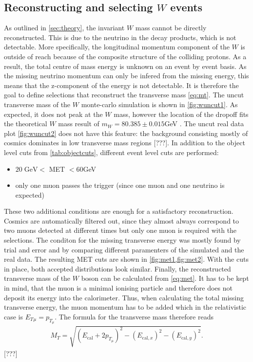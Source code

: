 \documentclass[twoside,        %
               BCOR12mm,       %
               ngerman,english, %
               fleqn,headsepline=false,footsepline=false
              ]{Vorlage/MFPREPORT}
\begin{document}
\subsection{Reconstructing and selecting $W$ events}
As outlined in \cref{sec:theory}, the invariant $W$ mass cannot be directly
reconstructed. This is due to the neutrino in the decay products, which is not
detectable. More specifically, the longitudinal momentum component of the $W$ is
outside of reach because of the composite structure of the colliding protons.
As a result, the total centre of mass energy is unknown on an event by event
basis. As the missing neutrino momentum can only be infered from the missing energy,
this means that the z-component of the energy is not detectable.
It is therefore the goal to define selections that reconstruct the transverse
mass \cref{eq:mt}. The uncut transverse mass of the $W$ monte-carlo simulation
is shown in \cref{fig:wuncut1}. As expected, it does not peak at the $W$ mass,
however the location of the dropoff fits the theoretical $W$ mass result of
$m_W=80.385\pm0.015$\;GeV \cite{pdataz}. The uncut real data plot
\cref{fig:wuncut2} does not have this feature: the background consisting mostly
of cosmics dominates in low transverse mass regions [???]. In addition to the
object level cuts from \cref{tab:objectcuts}, different event level cuts are
performed:
\begin{itemize}
    \item $20\;\text{GeV}<$ MET $<60$\;GeV
    \item only one muon passes the trigger (since one muon and one neutrino is
        expected)
\end{itemize}
These two additional conditions are enough for a satisfactory reconstruction.
Cosmics are automatically filtered out, since they almost always correspond to
two muons detected at different times but only one muon is required with the
selections. The conditon for the missing transverse energy was mostly found by
trial and error and by comparing different paramenters of the simulated and the
real data. The resulting MET cuts are shown in \cref{fig:met1,fig:met2}. With
the cuts in place, both accepted distributions look similar.
Finally, the reconstructed transverse mass of the $W$ boson can be calculated
from \cref{eq:met}. It has to be kept in mind, that the muon is a minimal
ionising particle and therefore does not deposit its energy into the
calorimeter. Thus, when calculating the total missing transverse energy, the muon
momentum has to be added which in the relativistic case is
$E_T{_{\mu}}=p_{T_\mu}$. The formula for the transverse mass therefore reads
\begin{align}
    \label{eq:mt2}
    M_T=\sqrt{(E_\text{cal}+2p_{T_{\mu}})^2-(E_{\text{cal},x})^2-(E_{\text{cal},y})^2}.
\end{align}
[???]
\end{document}
